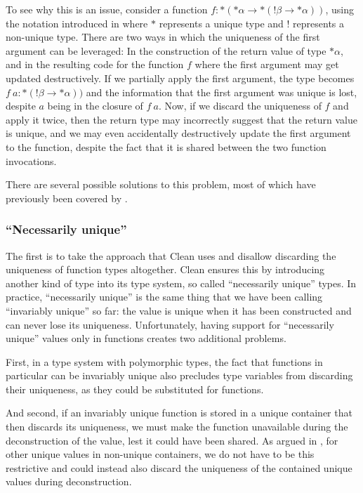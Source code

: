 To see why this is an issue, consider a function $f : *(*\alpha \to *(!\beta \to *\alpha))$, using the notation introduced in  where $*$ represents a unique type and $!$ represents a non-unique type. There are two ways in which the uniqueness of the first argument can be leveraged: In the construction of the return value of type $*\alpha$, and in the resulting code for the function $f$ where the first argument may get updated destructively. If we partially apply the first argument, the type becomes $f\ a : *(!\beta \to *\alpha))$ and the information that the first argument was unique is lost, despite $a$ being in the closure of $f\ a$. Now, if we discard the uniqueness of $f$ and apply it twice, then the return type may incorrectly suggest that the return value is unique, and we may even accidentally destructively update the first argument to the function, despite the fact that it is shared between the two function invocations.

There are several possible solutions to this problem, most of which have previously been covered by \cite{de_vries_making_2009}. 

\subsubsection{``Necessarily unique''}
The first is to take the approach that Clean uses and disallow discarding the uniqueness of function types altogether. Clean ensures this by introducing another kind of type into its type system, so called ``necessarily unique'' types. In practice, ``necessarily unique'' is the same thing that we have been calling ``invariably unique'' so far: the value is unique when it has been constructed and can never lose its uniqueness. Unfortunately, having support for ``necessarily unique'' values only in functions creates two additional problems.

First, in a type system with polymorphic types, the fact that functions in particular can be invariably unique also precludes type variables from discarding their uniqueness, as they could be substituted for functions.

And second, if an invariably unique function is stored in a unique container that then discards its uniqueness, we must make the function unavailable during the deconstruction of the value, lest it could have been shared. As argued in , for other unique values in non-unique containers, we do not have to be this restrictive and could instead also discard the uniqueness of the contained unique values during deconstruction.

